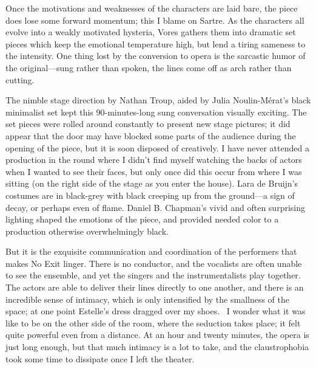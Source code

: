 Once the motivations and weaknesses of the characters are laid bare, the piece does lose some forward momentum; this I blame on Sartre. As the characters all evolve into a weakly motivated hysteria, Vores gathers them into dramatic set pieces which keep the emotional temperature high, but lend a tiring sameness to the intensity. One thing lost by the conversion to opera is the sarcastic humor of the original—sung rather than spoken, the lines come off as arch rather than cutting.

The nimble stage direction by Nathan Troup, aided by Julia Noulin-Mérat’s black minimalist set kept this 90-minutes-long sung conversation visually exciting. The set pieces were rolled around constantly to present new stage pictures; it did appear that the door may have blocked some parts of the audience during the opening of the piece, but it is soon disposed of creatively. I have never attended a production in the round where I didn’t find myself watching the backs of actors when I wanted to see their faces, but only once did this occur from where I was sitting (on the right side of the stage as you enter the house). Lara de Bruijn’s costumes are in black-grey with black creeping up from the ground—a sign of decay, or perhaps even of flame. Daniel B. Chapman’s vivid and often surprising lighting shaped the emotions of the piece, and provided needed color to a production otherwise overwhelmingly black.

But it is the exquisite communication and coordination of the performers that makes No Exit linger. There is no conductor, and the vocalists are often unable to see the ensemble, and yet the singers and the instrumentalists play together. The actors are able to deliver their lines directly to one another, and there is an incredible sense of intimacy, which is only intensified by the smallness of the space; at one point Estelle’s dress dragged over my shoes.  I wonder what it was like to be on the other side of the room, where the seduction takes place; it felt quite powerful even from a distance. At an hour and twenty minutes, the opera is just long enough, but that much intimacy is a lot to take, and the claustrophobia took some time to dissipate once I left the theater.
